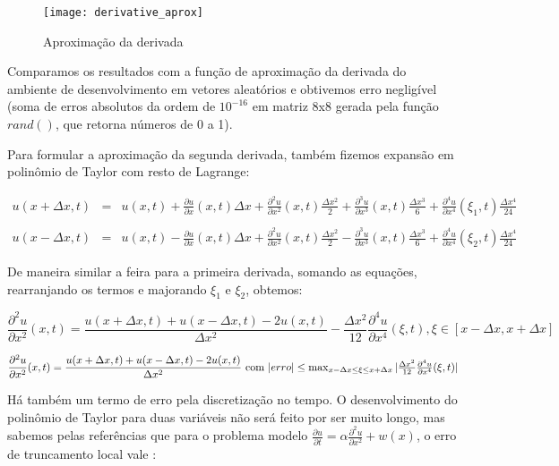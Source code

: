 \documentclass[12pt,fleqn]{article}
\begin{document}
\begin{figure}[H]
	\centering
		\texttt{[image: derivative\_aprox]}
		\caption{Aproximação da derivada}
		\label{fig:derivative_aprox}
\end{figure}

Comparamos os resultados com a função de aproximação da derivada do ambiente de desenvolvimento em vetores aleatórios e obtivemos erro negligível (soma de erros absolutos da ordem de $10^{-16}$ em matriz 8x8 gerada pela função $rand()$, que retorna números de 0 a 1).

Para formular a aproximação da segunda derivada, também fizemos expansão em polinômio de Taylor com resto de Lagrange:

\[
\begin{array}{rcl}
	u(x + \Delta x, t) & = & u(x, t) + \frac{\partial u}{\partial x}(x, t) \Delta x + \frac{\partial^2 u}{\partial x^2}(x, t) \frac{\Delta x ^ 2}{2} + \frac{\partial^3 u}{\partial x^3}(x, t) \frac{\Delta x ^ 3}{6} + \frac{\partial^4 u}{\partial x^4}(\xi_1, t) \frac{\Delta x ^ 4}{24} \\ \\
	u(x - \Delta x, t) & = & u(x, t) - \frac{\partial u}{\partial x}(x, t) \Delta x + \frac{\partial^2 u}{\partial x^2}(x, t) \frac{\Delta x ^ 2}{2} - \frac{\partial^3 u}{\partial x^3}(x, t) \frac{\Delta x ^ 3}{6} + \frac{\partial^4 u}{\partial x^4}(\xi_2, t) \frac{\Delta x ^ 4}{24}
\end{array}
\]

De maneira similar a feira para a primeira derivada, somando as equações, rearranjando os termos e majorando $\xi_1$ e $\xi_2$, obtemos:

\[
\frac{\partial^2 u}{\partial x^2}(x, t) = \frac{u(x + \Delta x, t) + u(x - \Delta x, t) - 2 u(x, t)}{\Delta x^2} - \frac{\Delta x^2}{12} \frac{\partial^4 u}{\partial x^4} (\xi, t), \xi \in [x - \Delta x, x + \Delta x]
\]

\[
\frac{\partial^2 u}{\partial x^2}(x, t) = \frac{u(x + \Delta x, t) + u(x - \Delta x, t) - 2 u(x, t)}{\Delta x^2} $ com $ |erro| \leq \max_{x - \Delta x \leq \xi \leq x + \Delta x} |\frac{\Delta x^2}{12} \frac{\partial^4 u}{\partial x^4} (\xi, t)|
\]

Há também um termo de erro pela discretização no tempo. O desenvolvimento do polinômio de Taylor para duas variáveis não será feito por ser muito longo, mas sabemos pelas referências que para o problema modelo $\frac{\partial u}{\partial t} = \alpha \frac{\partial^2 u}{\partial x^2} + w(x)$, o erro de truncamento local vale \cite{livro}:
\end{document}
